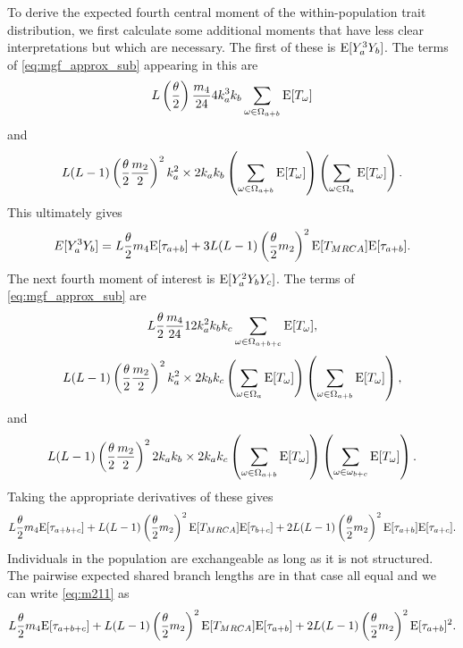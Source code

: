 To derive the expected fourth central moment of the within-population trait
distribution, we first calculate some additional moments that have less clear
interpretations but which are necessary. The first of these is $\mathrm{E}[Y_a^3Y_b]$.
The terms of
\eqref{eq:mgf_approx_sub} appearing in this are
\begin{equation*}
  L \left(\frac{\theta}{2}\right) \frac{m_4}{24} 4 k_a^3k_b \sum_{\omega \in \Omega_{a+b}} \mathrm{E}[T_\omega]
\end{equation*}
and
\begin{equation*}
  L(L-1)\left(\frac{\theta}{2} \frac{m_2}{2}\right)^2 k_a^2 \times 2k_ak_b
  \left( \sum_{\omega \in \Omega_{a+b}} \mathrm{E}[T_\omega] \right) \left( \sum_{\omega \in \Omega_a} \mathrm{E}[T_\omega] \right).
\end{equation*}
This ultimately gives
\begin{equation}
  \label{eq:m31}
  E[Y_a^3Y_b] = L \frac{\theta}{2} m_4 \mathrm{E}[\tau_{a+b}] + 3L(L-1) \left(\frac{\theta}{2} m_2\right)^2 \mathrm{E}[T_{MRCA}]\mathrm{E}[\tau_{a+b}].
\end{equation}
The next fourth moment of interest is $\mathrm{E}[Y_a^2Y_bY_c]$. The terms of
\eqref{eq:mgf_approx_sub} are
\begin{equation*}
  L \frac{\theta}{2} \frac{m_4}{24} 12k_a^2k_bk_c \sum_{\omega \in \Omega_{a+b+c}} \mathrm{E}[T_\omega],
\end{equation*}
\begin{equation*}
  L(L-1) \left(\frac{\theta}{2} \frac{m_2}{2}\right)^2 k_a^2 \times 2k_bk_c
  \left( \sum_{\omega \in \Omega_a} \mathrm{E}[T_\omega] \right)\left( \sum_{\omega \in \Omega_{a+b}} \mathrm{E}[T_\omega] \right),
\end{equation*}
and 
\begin{equation*}
  L(L-1) \left(\frac{\theta}{2} \frac{m_2}{2}\right)^2 2k_ak_b \times 2k_ak_c \left( \sum_{\omega \in \Omega_{a+b}} \mathrm{E}[T_\omega] \right)
  \left( \sum_{\omega \in \omega_{b+c}} \mathrm{E}[T_\omega] \right).
\end{equation*}
Taking the appropriate derivatives of these gives
\begin{equation}
  \label{eq:m211}
  L \frac{\theta}{2} m_4 \mathrm{E}[\tau_{a+b+c}] + L(L-1)\left(\frac{\theta}{2} m_2\right)^2\mathrm{E}[T_{MRCA}]\mathrm{E}[\tau_{b+c}] +
  2L(L-1) \left(\frac{\theta}{2} m_2\right)^2\mathrm{E}[\tau_{a+b}]\mathrm{E}[\tau_{a+c}].
\end{equation}
Individuals in the population are exchangeable as long as it is not structured.
The pairwise expected shared branch lengths are in that case all equal and we
can write \eqref{eq:m211} as
\begin{equation}
  \label{eq:m211s}
  L \frac{\theta}{2} m_4 \mathrm{E}[\tau_{a+b+c}] + L(L-1)\left(\frac{\theta}{2} m_2\right)^2\mathrm{E}[T_{MRCA}]\mathrm{E}[\tau_{a+b}] +
  2L(L-1) \left(\frac{\theta}{2} m_2\right)^2\mathrm{E}[\tau_{a+b}]^2.
\end{equation}
